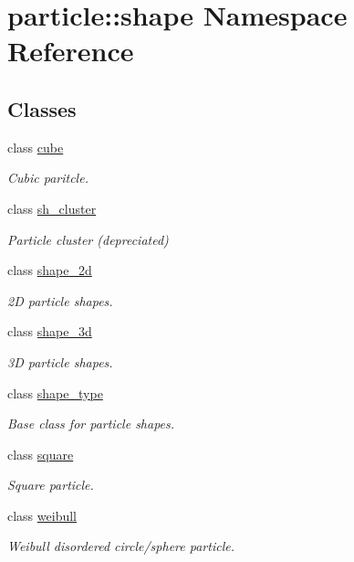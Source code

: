 \hypertarget{namespaceparticle_1_1shape}{}\section{particle\+:\+:shape Namespace Reference}
\label{namespaceparticle_1_1shape}
\subsection*{Classes}
\begin{DoxyCompactItemize}
\item 
class \hyperlink{classparticle_1_1shape_1_1cube}{cube}
\begin{DoxyCompactList}\small\item\em Cubic paritcle. \end{DoxyCompactList}\item 
class \hyperlink{classparticle_1_1shape_1_1sh__cluster}{sh\+\_\+cluster}
\begin{DoxyCompactList}\small\item\em Particle cluster (depreciated) \end{DoxyCompactList}\item 
class \hyperlink{classparticle_1_1shape_1_1shape__2d}{shape\+\_\+2d}
\begin{DoxyCompactList}\small\item\em 2D particle shapes. \end{DoxyCompactList}\item 
class \hyperlink{classparticle_1_1shape_1_1shape__3d}{shape\+\_\+3d}
\begin{DoxyCompactList}\small\item\em 3D particle shapes. \end{DoxyCompactList}\item 
class \hyperlink{classparticle_1_1shape_1_1shape__type}{shape\+\_\+type}
\begin{DoxyCompactList}\small\item\em Base class for particle shapes. \end{DoxyCompactList}\item 
class \hyperlink{classparticle_1_1shape_1_1square}{square}
\begin{DoxyCompactList}\small\item\em Square particle. \end{DoxyCompactList}\item 
class \hyperlink{classparticle_1_1shape_1_1weibull}{weibull}
\begin{DoxyCompactList}\small\item\em Weibull disordered circle/sphere particle. \end{DoxyCompactList}\end{DoxyCompactItemize}
